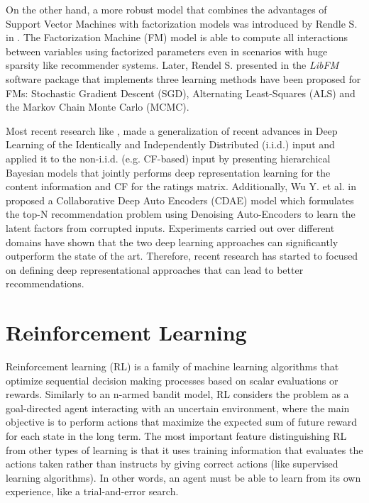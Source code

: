 On the other hand, a more robust model that combines the advantages of Support Vector Machines with factorization models was introduced by Rendle S. in \cite{rendle2010factorization}. The Factorization Machine (FM) model is able to compute all interactions between variables using factorized parameters even in scenarios with huge sparsity like recommender systems. Later, Rendel S. presented in \cite{rendle2012factorization} the \textit{LibFM} software package that implements three learning methods have been proposed for FMs: Stochastic Gradient Descent (SGD)\cite{rendle2010factorization}, Alternating Least-Squares (ALS)\cite{rendle2011fast} and the Markov Chain Monte Carlo (MCMC)\cite{freudenthaler2011bayesian}.

Most recent research like \cite{wang2015collaborative}, made a generalization of recent advances in Deep Learning \cite{bengio2013representation} of the Identically and Independently Distributed (i.i.d.) input and applied it to the non-i.i.d. (e.g. CF-based) input by presenting hierarchical Bayesian models that jointly performs deep representation learning for the content information and CF for the ratings matrix. Additionally, Wu Y. et al. in \cite{wu2016collaborative} proposed a Collaborative Deep Auto Encoders (CDAE) model which formulates the top-N recommendation problem using Denoising Auto-Encoders to learn the latent factors from corrupted inputs. Experiments carried out over different domains have shown that the two deep learning approaches can significantly outperform the state of the art. Therefore, recent research has started to focused on defining deep representational approaches that can lead to better recommendations.

\section{Reinforcement Learning}
Reinforcement learning (RL) \cite{kaelbling1996reinforcement} is a family of machine learning algorithms that optimize sequential decision making processes based on scalar evaluations or rewards. Similarly to an n-armed bandit model\cite{katehakis1987multi}, RL considers the problem as a goal-directed agent interacting with an uncertain environment, where the main objective is to perform actions that maximize the expected sum of future reward for each state in the long term. The most important feature distinguishing RL from other types of learning is that it uses training information that evaluates the actions taken rather than instructs by giving correct actions (like supervised learning algorithms). In other words, an agent must be able to learn from its own experience, like a trial-and-error search.

